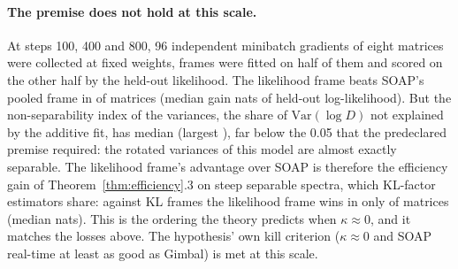 \begin{table}[t]
\centering\small

\caption{Small language model (E3.2), final validation loss at each optimizer's selected learning
rate. ``gimbal'' is the default before the repair of this section (fixed amortization,
$\alpha=0.02$); ``gimbal-k1'' moves the frame every step. Other peers: SOAP real-time, KL-SOAP,
Muon, NorMuon, SPlus, ARO (\cref{app:optimizers}).}
\label{tab:smalllm}
\end{table}

\paragraph{The premise does not hold at this scale.} At steps 100, 400 and 800, 96 independent
minibatch gradients of eight matrices were collected at fixed weights, frames were fitted on half
of them and scored on the other half by the held-out likelihood. The likelihood frame beats SOAP's
pooled frame in \EThreeOneWinsSoap{} of \EThreeOneMatrices{} matrices (median gain
\EThreeOneGainSoap{} nats of held-out log-likelihood). But the non-separability index of the
variances, the share of $\mathrm{Var}(\log D)$ not explained by the additive fit, has median
\KappaMedian{} (largest \KappaMax{}), far below the 0.05 that the predeclared premise required: the
rotated variances of this model are almost exactly separable. The likelihood frame's advantage over
SOAP is therefore the efficiency gain of Theorem~\ref{thm:efficiency}.3 on steep separable spectra,
which KL-factor estimators share: against KL frames the likelihood frame wins in only
\EThreeOneWinsKl{} of \EThreeOneMatrices{} matrices (median \EThreeOneGainKl{} nats). This is the
ordering the theory predicts when $\kappa\approx0$, and it matches the losses above. The
hypothesis' own kill criterion ($\kappa\approx0$ and SOAP real-time at least as good as Gimbal) is met
at this scale.
